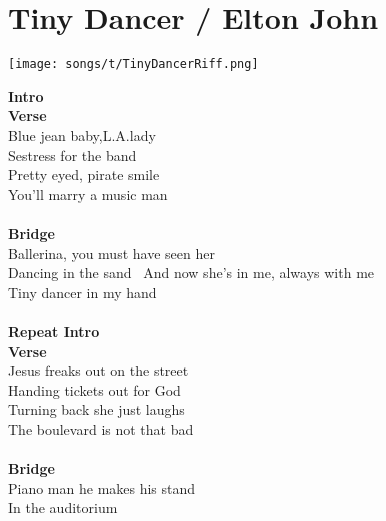 \section{Tiny Dancer / Elton John}\label{sec:tinydancer}

\texttt{[image: songs/t/TinyDancerRiff.png]}


\Cmajor
\Fmajor
\Gmajor
\EminorSeven
\AminorSeven
\Dminor
\Eseven
\Aminor
\Gseven

\textbf{Intro}\\
\textbf{Verse}\\
Blue jean baby,L.A.lady\\
Sestress for the band     \\
Pretty eyed, pirate smile\\
You’ll marry a music man   \\
\\
\textbf{Bridge}\\
Ballerina,  you must have seen her\\
    Dancing in the sand   \
And now she’s in me, always with me\\
\upchord{C}Tiny \upchord{C}dancer in my \upchord{G}hand   \upchord{F}          \\
\\
\textbf{Repeat Intro}\\
\textbf{Verse}\\
Jesus freaks out on the street\\
Handing tickets out for God    \\
Turning \upchord{F}back she just laughs\\
\upchord{C}The boule\upchord{C}vard is not that bad   \upchord{F}     \\
\\
\textbf{Bridge}\\
Piano man he makes his stand\\
\upchord{Dm}In the \upchord{E7}auditori\upchord{Am}um     \upchord{G7}\\
